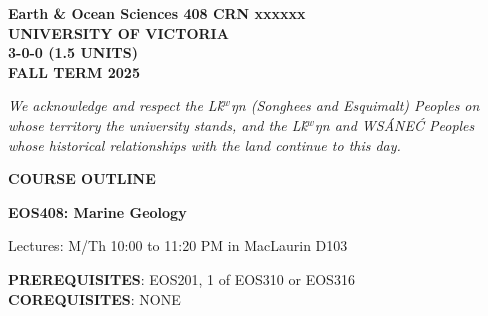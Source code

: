 \documentclass[11pt]{article}
\def\schwa{{\tenipa\char64}}
\begin{document}

%


\hspace*{\fill}\textbf{Earth \& Ocean Sciences 408 CRN xxxxxx}\\
\hspace*{\fill}\textbf{UNIVERSITY OF VICTORIA}\\
\hspace*{\fill}\textbf{3-0-0 (1.5 UNITS)}\\
\hspace*{\fill}\textbf{FALL TERM 2025}\\


\noindent\hrulefill

\begin{center}
\emph{We acknowledge and respect the L\schwa\'k$^w$\schwa ŋ\schwa n (Songhees and Esquimalt) Peoples on whose territory the university stands, and the L\schwa\'k$^w$\schwa ŋ\schwa n and WS\'ANE\'C Peoples whose historical relationships with the land continue to this day.}
\end{center}

\noindent\hrulefill

\begin{center}
\Large \textbf{COURSE OUTLINE}

\Large \textbf{EOS408: Marine Geology}

\normalsize Lectures: M/Th 10:00 to 11:20 PM in MacLaurin D103 \\
\end{center}

\noindent\hrulefill

\textbf{PREREQUISITES}: EOS201, 1 of EOS310 or EOS316\\
\textbf{COREQUISITES}: NONE\\
\end{document}
